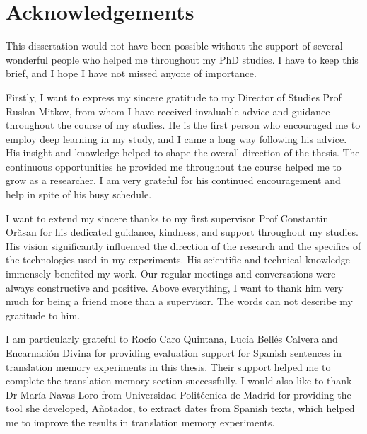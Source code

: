 
\chapter*{Acknowledgements}
This dissertation would not have been possible without the support of several wonderful people who helped me throughout my PhD studies. I have to keep this brief, and I hope I have not missed anyone of importance.

Firstly, I want to express my sincere gratitude to my Director of Studies Prof Ruslan Mitkov, from whom I have received invaluable advice and guidance throughout the course of my studies. He is the first person who encouraged me to employ deep learning in my study, and I came a long way following his advice. His insight and knowledge helped to shape the overall direction of the thesis. The continuous opportunities he provided me throughout the course helped me to grow as a researcher. I am very grateful for his continued encouragement and help in spite of his busy schedule.

I want to extend my sincere thanks to my first supervisor Prof Constantin Orăsan for his dedicated guidance, kindness, and support throughout my studies. His vision significantly influenced the direction of the research and the specifics of the technologies used in my experiments. His scientific and technical knowledge immensely benefited my work. Our regular meetings and conversations were always constructive and positive. Above everything, I want to thank him very much for being a friend more than a supervisor. The words can not describe my gratitude to him.

I am particularly grateful to Rocío Caro Quintana, Lucía Bellés Calvera and Encarnación Divina for providing evaluation support for Spanish sentences in translation memory experiments in this thesis. Their support helped me to complete the translation memory section successfully. I would also like to thank Dr María Navas Loro from Universidad Politécnica de Madrid for providing the tool she developed, Añotador, to extract dates from Spanish texts, which helped me to improve the results in translation memory experiments.


